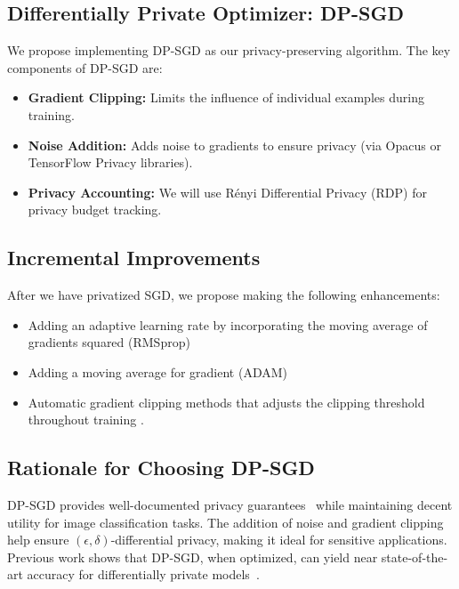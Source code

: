\subsection{Differentially Private Optimizer: DP-SGD}\label{subsec:differentially-private-optimizer:-dp-sgd}
We propose implementing DP-SGD as our privacy-preserving algorithm.
The key components of DP-SGD are:
\begin{itemize}
    \item \textbf{Gradient Clipping:} Limits the influence of individual examples during training.
    \item \textbf{Noise Addition:} Adds noise to gradients to ensure privacy (via Opacus or TensorFlow Privacy libraries).
    \item \textbf{Privacy Accounting:} We will use Rényi Differential Privacy (RDP) for privacy budget tracking.
\end{itemize}

\subsection{Incremental Improvements}\label{subsec:incremental-improvements}
After we have privatized SGD, we propose making the following enhancements:
\begin{itemize}
    \item Adding an adaptive learning rate by incorporating the moving average of gradients squared (RMSprop)~\cite{DBLP:journals/corr/abs-1807-06766}
    \item Adding a moving average for gradient (ADAM)~\cite{DBLP:journals/corr/abs-1807-06766}
    \item Automatic gradient clipping methods that adjusts the clipping threshold throughout training \cite{bu2023automaticclippingdifferentiallyprivate}.
\end{itemize}

\subsection{Rationale for Choosing DP-SGD}\label{subsec:rationale-for-choosing-dp-sgd}
DP-SGD provides well-documented privacy guarantees~\cite{Abadi_2016_DeepLearningDifferentialPrivacy}
while maintaining decent utility for image classification tasks. The addition of noise and gradient clipping help ensure $(\epsilon, \delta)$-differential privacy,
making it ideal for sensitive applications. Previous work shows that DP-SGD, when optimized, can yield near state-of-the-art accuracy
for differentially private models~\cite{De_2022_ScaleDP_ImageClassification}.



